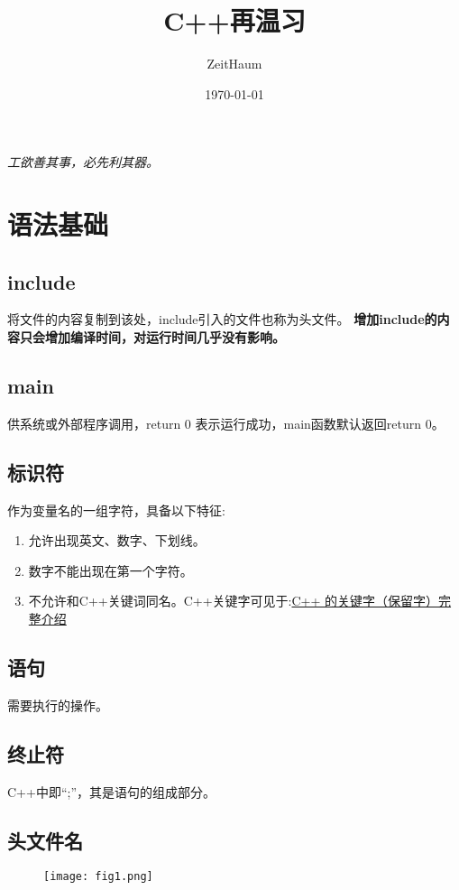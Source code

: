 \documentclass{article}
\author{ZeitHaum}
\date{\today}
\title{C++再温习}
\begin{document}
    \maketitle
    \newpage 
    \tableofcontents
    \newpage
    \setcounter{page}{1}
    \emph{工欲善其事，必先利其器。}
    \section{语法基础}
    \subsection{include}
    将文件的内容复制到该处，include引入的文件也称为头文件。
    \textbf{增加include的内容只会增加编译时间，对运行时间几乎没有影响。}
    \subsection{main}
    供系统或外部程序调用，return 0 表示运行成功，main函数默认返回return 0。
    \subsection{标识符}
    作为变量名的一组字符，具备以下特征:

    \begin{enumerate}
        \item 允许出现英文、数字、下划线。
        \item 数字不能出现在第一个字符。
        \item 不允许和C++关键词同名。C++关键字可见于:\href{https://www.runoob.com/w3cnote/cpp-keyword-intro.html}{C++ 的关键字（保留字）完整介绍}
    \end{enumerate}
    \subsection{语句}
    需要执行的操作。

    \subsection{终止符}
    C++中即``;''，其是语句的组成部分。

    \subsection{头文件名}
    \begin{figure}[H]
        \centering
        \texttt{[image: fig1.png]}
    \end{figure}
\end{document}

